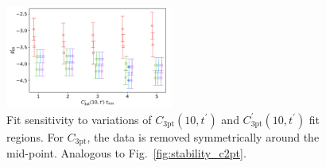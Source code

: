 \documentclass[prd,aps,twocolumn,superscriptaddress,tightenlines,nofootinbib,floatfix,preprintnumbers,10pt]{revtex4-1}
\begin{document}
\begin{figure}[h]
{		\includegraphics[width=0.49\textwidth]{plots/figures/dgV10_dgV.pdf}
		\caption{
			Fit sensitivity to variations of $C_{\mathrm{3pt}}(10,t^\prime)$ and $C^\prime_{\mathrm{3pt}}(10,t^\prime)$ fit regions. For $C_{\mathrm{3pt}}$, the data is removed symmetrically around the mid-point. Analogous to Fig.~\ref{fig:stability_c2pt}.}
		\label{fig:stability_c3pt10}
}\end{figure}
\end{document}
